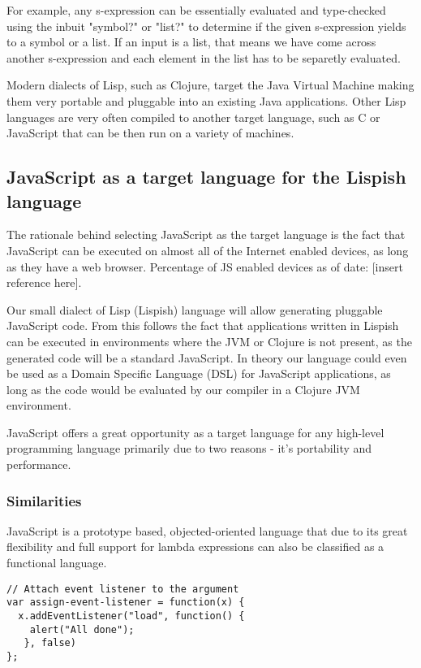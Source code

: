 For example, any s-expression can be essentially evaluated and type-checked using the inbuit "symbol?" or "list?" to determine if the given s-expression yields to a symbol or a list. If an input is a list, that means we have come across another s-expression and each element in the list has to be separetly evaluated. 

Modern dialects of Lisp, such as Clojure, target the Java Virtual Machine making them very portable and pluggable into an existing Java applications.
Other Lisp languages are very often compiled to another target language, such as C or JavaScript that can be then run on a variety of machines. 

\subsection{JavaScript as a target language for the Lispish language}
The rationale behind selecting JavaScript as the target language is the fact that JavaScript can be executed on almost all of the Internet enabled devices, as long as they have a web browser. Percentage of JS enabled devices as of date: [insert reference here].

Our small dialect of Lisp (Lispish) language will allow generating pluggable JavaScript code. 
From this follows the fact that applications written in Lispish can be executed in environments where the JVM or Clojure is not present, as the generated code will be a standard JavaScript.
In theory our language could even be used as a Domain Specific Language (DSL) for JavaScript applications, as long as the code would be evaluated by our compiler in a Clojure JVM environment.

JavaScript offers a great opportunity as a target language for any high-level programming language primarily due to two reasons - it's portability and performance. 

\subsubsection{Similarities}
JavaScript is a prototype based, objected-oriented language that due to its great flexibility and full support for lambda expressions can also be classified as a functional language.

\begin{lstlisting}
// Attach event listener to the argument
var assign-event-listener = function(x) {
  x.addEventListener("load", function() { 
  	alert("All done"); 
   }, false)
};
\end{lstlisting}

